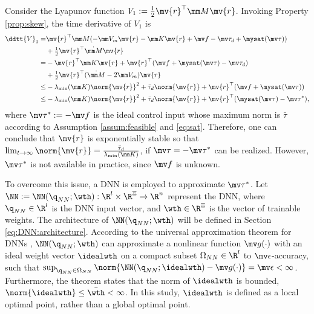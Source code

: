 \documentclass[lettersize,journal]{IEEEtran}
\newcommand*{\fe}{\mv{r}}
\begin{document}
Consider the Lyapunov function $V_1:= \tfrac{1}{2}\fe^\top \mm M\fe$. 
Invoking Property \ref{prop:skew}, the time derivative of $V_1$ is
\begin{equation}
    \begin{aligned}
        \ddtt{V}_1
        =&
        \fe^\top \mm M (
            -\mm V_m \fe -\mm K \fe + \mv f
            -\mv \tau_d + \mysat(\mv\tau)
        )
        \\
        &
        +
        \tfrac{1}{2}
        \fe^\top \dot{\mm M}\fe
        \\
        =&
        -
        \fe^\top \mm K \fe 
        +
        \fe^\top (
            \mv f+\mysat(\mv\tau)
            -\mv \tau_d
        )
        \\
        &
        +
        \tfrac{1}{2}
        \fe^\top(\dot{\mm M}- 2\mm V_m)\fe
        \\
        \le&
        -\lambda_{\min}(\mm K)\norm{\fe}^2
        +
        \bar\tau_d\norm{\fe}
        +
        \fe^\top (\mv f+\mysat(\mv \tau))
        \\
        \le&
        -\lambda_{\min}(\mm K)\norm{\fe}^2
        +
        \bar\tau_d\norm{\fe}
        +
        \fe^\top (\mysat(\mv\tau)-\mv\tau^*)
        ,
    \end{aligned}
    \label{eq:lya1:dot1}
\end{equation}
where $\mv\tau^*:= -\mv f$ is the ideal control input whose maximum norm is $\bar\tau$ according to Assumption \ref{assum:feasible} and \eqref{eq:sat}. 
Therefore, one can conclude that $\fe$ is exponentially stable so that $\lim_{t\to\infty}\norm{\fe}=\tfrac{\bar\tau_d}{\lambda_{\min}(\mm K)}$, if $\mv \tau=-\mv\tau^*$ can be realized.
However, $\mv \tau^*$ is not available in practice, since $\mv f$ is unknown.

To overcome this issue, a DNN is employed to approximate $\mv\tau^*$.
Let $\NN:=\NN(\q_{NN};\wth): \R^{l}\times\R^{\Xi}\to\R^{n}$ represent the DNN, where $\q_{NN}\in\R^{l}$ is the DNN input vector, and $\wth\in\R^{\Xi}$ is the vector of trainable weights.
The architecture of $\NN(\q_{NN};\wth)$ will be defined in Section \ref{eq:DNN:architecture}.
According to the universal approximation theorem for DNNs \cite{Kidger:2020aa}, $\NN(\q_{NN};\wth)$ can approximate a nonlinear function $\mv g(\cdot)$ with an ideal weight vector $\idealwth$ on a compact subset $\Omega_{NN}\in\R^{l}$ to $\mv\epsilon$-accuracy, such that $\sup_{\q_{NN}\in\Omega_{NN}}\norm{ \NN(\q_{NN};\idealwth) - \mv g(\cdot)} = \mv\epsilon < \infty$.
Furthermore, the theorem states that the norm of $\idealwth$ is bounded, \ie $\norm{\idealwth}\le \bar\wth<\infty$.
In this study, $\idealwth$ is defined as a local optimal point, rather than a global optimal point.
\end{document}
